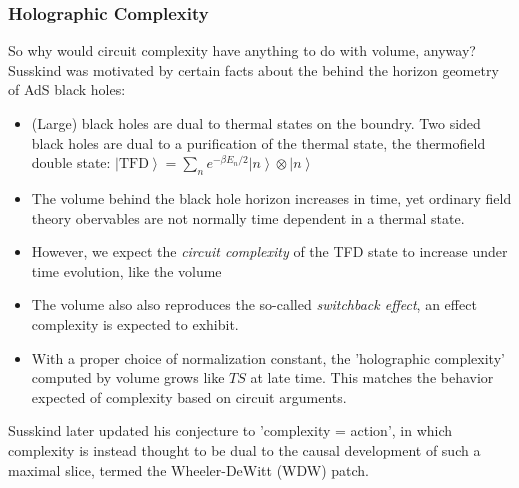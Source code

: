 \documentclass[10pt,aspectratio=169]{beamer}
\newcommand{\ket}[1]{\left| #1 \right>}
\begin{document}
\begin{frame}
\frametitle{Holographic Complexity}

So why would circuit complexity have anything to do with volume, anyway? Susskind was motivated by certain facts about the behind the horizon geometry of AdS black holes:

\begin{itemize}

\item (Large) black holes are dual to thermal states on the boundry. Two sided black holes are dual to a purification of the thermal state, the thermofield double state: $\ket{\text{TFD}} = \displaystyle\sum_n e^{- \beta E_n /2} \ket{n} \otimes \ket{n}$

\item The volume behind the black hole horizon increases in time, yet ordinary field theory obervables are not normally time dependent in a thermal state.

\item However, we expect the {\it circuit complexity} of the TFD state to increase under time evolution, like the volume

\item The volume also also reproduces the so-called {\it switchback effect}, an effect complexity is expected to exhibit.

\item With a proper choice of normalization constant, the 'holographic complexity' computed by volume grows like $T S$ at late time. This matches the behavior expected of complexity based on circuit arguments. 

\end{itemize}

Susskind later updated his conjecture to 'complexity = action', in which complexity is instead thought to be dual to the causal development of such a maximal slice, termed the Wheeler-DeWitt (WDW) patch.

\end{frame}
\end{document}
